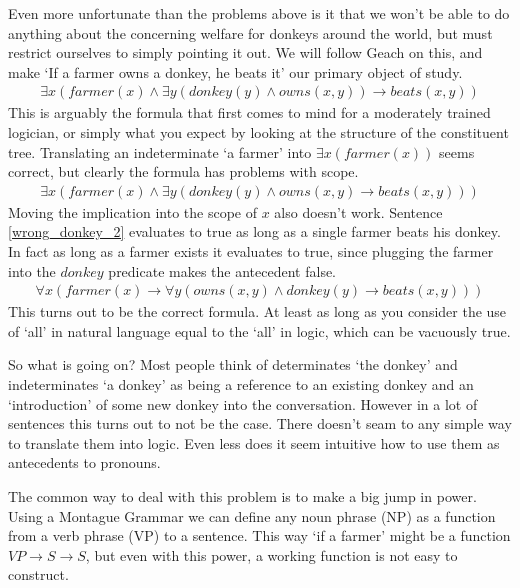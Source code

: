 \documentclass[12pt]{article}
\begin{document}
Even more unfortunate than the problems above is it that we won't be able to do anything about the concerning welfare for donkeys around the world\cite{donkey2013sanctuary}, but must restrict ourselves to simply pointing it out. We will follow Geach\cite{geach1962reference} on this, and make `If a farmer owns a donkey, he beats it' our primary object of study.
%
\begin{align}
\exists x (farmer(x) \wedge \exists y (donkey(y)\wedge owns(x,y)) \rightarrow beats(x,y))
\end{align}
%
This is arguably the formula that first comes to mind for a moderately trained logician, or simply what you expect by looking at the structure of the constituent tree. Translating an indeterminate `a farmer' into $\exists x(farmer(x))$ seems correct, but clearly the formula has problems with scope.
%
\begin{align}
\exists x (farmer(x) \wedge \exists y (donkey(y)\wedge owns(x,y) \rightarrow beats(x,y))) \label{wrong_donkey_2}
\end{align}
%
Moving the implication into the scope of $x$ also doesn't work. Sentence \eqref{wrong_donkey_2} evaluates to true as long as a single farmer beats his donkey. In fact as long as a farmer exists it evaluates to true, since plugging the farmer into the $donkey$ predicate makes the antecedent false.
%
\begin{align}
\forall x (farmer(x) \rightarrow \forall y ( owns(x,y) \wedge donkey(y) \rightarrow beats(x,y))) \label{correct_donkey}
\end{align}
%
This turns out to be the correct formula. At least as long as you consider the use of `all' in natural language equal to the `all' in logic, which can be vacuously true.

So what is going on? Most people think of determinates `the donkey' and indeterminates `a donkey' as being a reference to an existing donkey and an `introduction' of some new donkey into the conversation. However in a lot of sentences this turns out to not be the case. There doesn't seam to any simple way to translate them into logic. Even less does it seem intuitive how to use them as antecedents to pronouns.

The common way to deal with this problem is to make a big jump in power. Using a Montague Grammar we can define any noun phrase (NP) as a function from a verb phrase (VP) to a sentence. This way `if a farmer' might be a function $VP \to S \to S$, but even with this power, a working function is not easy to construct\cite{montague1973proper}.
\end{document}
